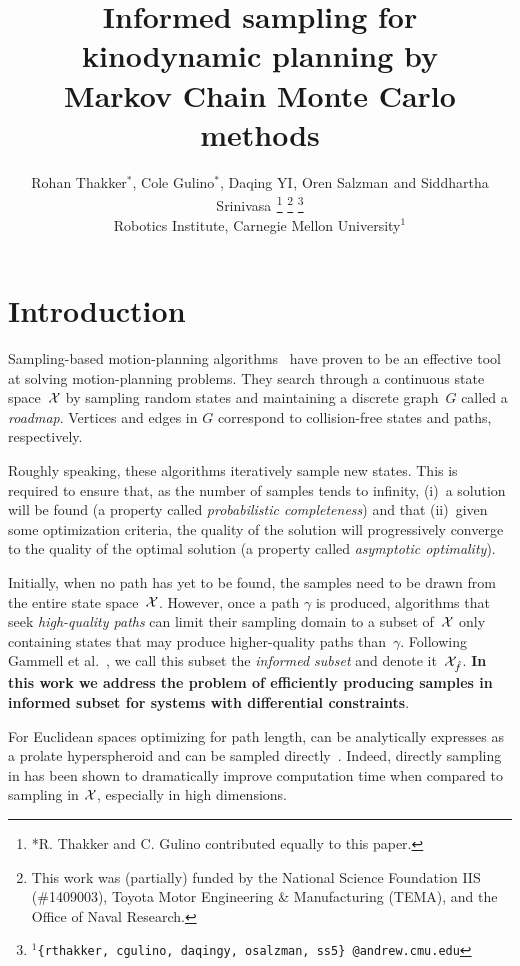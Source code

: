 \documentclass[letterpaper, 10 pt, conference]{ieeeconf}  %
\title{\LARGE \bf
Informed sampling for kinodynamic planning by \\ Markov Chain Monte Carlo methods
}
\author{
Rohan Thakker$^{*}$,
Cole Gulino$^{*}$,
Daqing YI$^{}$,
Oren Salzman$^{}$ and
Siddhartha Srinivasa$^{}$%
\thanks{*R. Thakker and C. Gulino contributed equally to this paper.}
\thanks{This work was (partially) funded by the National Science Foundation IIS (\#1409003), Toyota Motor Engineering \& Manufacturing (TEMA), and the Office of Naval Research.}%
\thanks{$^{1}${\tt\small \{rthakker, cgulino, daqingy, osalzman, ss5\} @andrew.cmu.edu}}%
%
\\        
Robotics Institute, Carnegie Mellon University$^{1}$
}
\begin{document}
\maketitle
\thispagestyle{empty}
\pagestyle{empty}


\begin{abstract}

\end{abstract}


\section{Introduction}
\label{sec:intro}

Sampling-based motion-planning algorithms~\cite{CBHKKLT05, L06} have proven to be an effective tool at solving motion-planning problems.
They search through a continuous state space~$\mathcal{X}$ by sampling random states and maintaining a discrete graph~$G$ called a \emph{roadmap}.
Vertices and edges in $G$ correspond to collision-free states and paths, respectively.

Roughly speaking, these algorithms iteratively sample new states.
This is required to ensure that, as the number of samples tends to infinity, 
(i)~a solution will be found 
(a property called \emph{probabilistic completeness})
and that
(ii)~given some optimization criteria, the quality of the solution will progressively converge to the quality of the optimal solution
(a property called \emph{asymptotic  optimality}).

Initially, 
when no path has yet to be found, 
the samples need to be drawn from the entire state space~$\mathcal{X}$.
However, once a path $\gamma$ is produced,  algorithms that seek \emph{high-quality paths} can limit their sampling domain to a subset of~$\mathcal{X}$ only  containing states that may produce higher-quality paths than~$\gamma$.
Following Gammell et al.~\cite{GSB14}, we call this subset the \emph{informed subset} and denote it~$\mathcal{X}_{\hat{f}}$.
\textbf{In this work we address the problem of efficiently producing samples in informed subset for systems with differential constraints}. 

For Euclidean spaces optimizing for path length, 
\Cinf can be analytically expresses as a prolate hyperspheroid and can be sampled directly~\cite{GSB14}.
Indeed, directly sampling in \Cinf has been shown to dramatically improve computation time when compared to sampling in $\mathcal{X}$, especially in high dimensions. 
\end{document}
